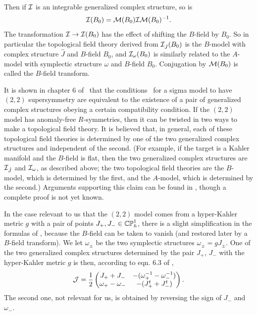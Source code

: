 Then if ${\cal I}$ is an integrable generalized complex structure,
so is %
\setcounter{equation}{25}
\begin{equation}\label{eq:nyt}
{\cal I}(B_0)={\cal M}(B_0){\cal I}{\cal
M}(B_0)^{-1}.
\end{equation}
 The transformation ${\cal I}\to {\cal I}(B_0)$ has
the effect of shifting the $B$-field by $B_0$.  So in particular
the topological field theory derived from ${\cal I}_{\hat J}(B_0)$
is the $B$-model with complex structure ${\hat J}$ and $B$-field
$B_0$, and ${\cal I}_\omega(B_0)$ is similarly related to the
$A$-model with symplectic structure $\omega$ and $B$-field $B_0$.
Conjugation by ${\cal M}(B_0)$ is called the $B$-field transform.

It is shown in chapter 6 of \cite{ref67}\ that the conditions \cite{ref66}\
for a sigma model to have $(2,2)$ supersymmetry are equivalent to the existence of a pair
of generalized complex structures obeying a certain compatibility
condition.  If the $(2,2)$ model has anomaly-free $R$-symmetries, then it can be twisted
in two ways to make a topological field theory.  It is believed that, in general, each of these
topological field theories is determined by one of the two generalized complex structures and independent
of the second.
(For example, if the target is a Kahler manifold and the $B$-field is flat, then the two
generalized complex structures are ${\cal I}_{\hat J}$ and ${\cal I}_\omega$, as described above;
the two topological field theories are the $B$-model, which is determined by the first, and the
$A$-model, which is determined by the second.)  Arguments supporting this claim can be found in
\cite{ref72,ref68}, though a complete proof is not yet known.

In the case relevant to us that the $(2,2)$ model
comes from a hyper-Kahler metric $g$ with a pair of points
$J_+,J_-\in \Bbb{CP}^1_h$, there is a slight simplification in the formulas
of \cite{ref67},
because the $B$-field can be taken to vanish (and restored later
by a $B$-field transform).  We let $\omega_\pm$ be the two
symplectic structures $\omega_\pm = gJ_\pm$.  One of the two
generalized complex structures determined by the pair $J_+$, $J_-$
with the hyper-Kahler metric $g$ is then, according to eqn. 6.3 of
\cite{ref67}, %
\setcounter{equation}{26}
\begin{equation}\label{eq:ugg}
{\cal J}={1\over 2}\left(\begin{matrix}J_++J_- &
-(\omega_+^{-1}-\omega_-^{-1})\\ \omega_+-\omega_- &
-(J_+^t+J_-^t)\\\end{matrix}\right).
\end{equation}
 The second one, not relevant for us,
is obtained by reversing the sign of $J_-$ and $\omega_-$.

